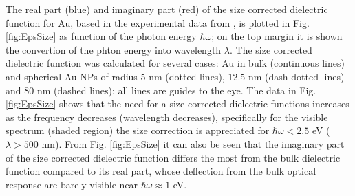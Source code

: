 The real part (blue) and imaginary part (red) of the size corrected dielectric function for Au, based in the experimental data from \citeauthor{johnson_optical_1972},  is plotted in Fig. \ref{fig:EpsSize} as function of the photon energy $\hbar\omega$; on the top margin it is shown the convertion of the phton energy into wavelength $\lambda$. The size corrected dielectric function was calculated for several cases: Au in bulk (continuous lines) and  spherical Au NPs of radius $5$ nm (dotted lines), $12.5$ nm (dash dotted lines) and $80$ nm (dashed lines); all lines are guides to the eye. The data in  Fig. \ref{fig:EpsSize} shows that the need for a size corrected dielectric functions increases as the frequency decreases (wavelength decreases), specifically for the visible spectrum (shaded region) the size correction is appreciated for $\hbar \omega < 2.5$ eV ($\lambda>500$ nm). From Fig. \ref{fig:EpsSize} it can also be seen that the imaginary part of the size corrected dielectric function differs the most from the bulk dielectric function compared to its real part, whose deflection from the bulk optical response are barely visible near $\hbar\omega\approx 1$ eV.



%





